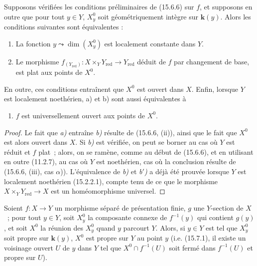 \begin{corollary}[15.6.7]
\label{IV.15.6.7-fr}
Supposons vérifiées les conditions préliminaires de \textup{(15.6.6)} sur $f$, et supposons en outre que pour tout $y\in Y$, $X_y^0$ soit géométriquement intègre sur $\boldsymbol{k}(y)$. Alors les conditions suivantes sont équivalentes :
\begin{enumerate}[label=\emph{\alph*)}]
  \item La fonction $y\leadsto\dim(X_y^0)$ est localement constante dans $Y$.
  \item Le morphisme $f_{(Y_{\mathrm{red}})}:X\times_Y Y_{\mathrm{red}}\to Y_{\mathrm{red}}$ déduit de $f$ par changement de base, est plat aux points de $X^0$.
\end{enumerate}

En outre, ces conditions entraînent que $X^0$ est ouvert dans $X$. Enfin, lorsque $Y$ est localement noethérien, a) et b) sont aussi équivalentes à
\begin{enumerate}
  \item[\rm b$'$)] $f$ est universellement ouvert aux points de $X^0$.
\end{enumerate}
\end{corollary}

\begin{proof}
Le fait que \emph{a)} entraîne \emph{b)} résulte de (15.6.6, (ii)), ainsi que le fait que $X^0$ est alors ouvert dans $X$. Si \emph{b)} est vérifiée, on peut se borner au cas où $Y$ est réduit et $f$ plat~; alors, on se ramène, comme au début de (15.6.6), et en utilisant en outre (11.2.7), au cas où $Y$ est noethérien, cas où la conclusion résulte de (15.6.6, (iii), cas $\alpha$)). L'équivalence de \emph{b)} et \emph{b$'$)} a déjà été prouvée lorsque $Y$ est localement noethérien (15.2.2.1), compte tenu de ce que le morphisme $X\times_Y Y_{\mathrm{red}}\to X$ est un homéomorphisme universel.
\end{proof}

\begin{proposition}[15.6.8]
\label{IV.15.6.8-fr}
Soient $f:X\to Y$ un morphisme séparé de présentation finie, $g$ une $Y$-section de $X$~; pour tout $y\in Y$, soit $X_y^0$ la composante connexe de $f^{-1}(y)$ qui contient $g(y)$, et soit $X^0$ la réunion des $X_y^0$ quand $y$ parcourt $Y$. Alors, si $y\in Y$ est tel que $X_y^0$ soit propre sur $\boldsymbol{k}(y)$, $X^0$ est propre sur $Y$ au point $y$ \textup{(i.e. (15.7.1), il existe un voisinage ouvert $U$ de $y$ dans $Y$ tel que $X^0\cap f^{-1}(U)$ soit fermé dans $f^{-1}(U)$ et propre sur $U$)}.
\end{proposition}

